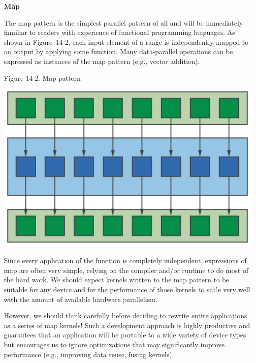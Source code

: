 \hspace*{\fill} \par %
\textbf{Map}

The map pattern is the simplest parallel pattern of all and will be immediately familiar to readers with experience of functional programming languages. As shown in Figure 14-2, each input element of a range is independently mapped to an output by applying some function. Many data-parallel operations can be expressed as instances of the map pattern (e.g., vector addition).\par

\hspace*{\fill} \par %
Figure 14-2. Map pattern
\begin{center}
	\includegraphics[width=1.\textwidth]{content/chapter-14/images/2}
\end{center}

Since every application of the function is completely independent, expressions of map are often very simple, relying on the compiler and/or runtime to do most of the hard work. We should expect kernels written to the map pattern to be suitable for any device and for the performance of those kernels to scale very well with the amount of available hardware parallelism.\par

However, we should think carefully before deciding to rewrite entire applications as a series of map kernels! Such a development approach is highly productive and guarantees that an application will be portable to a wide variety of device types but encourages us to ignore optimizations that may significantly improve performance (e.g., improving data reuse, fusing kernels).\par

